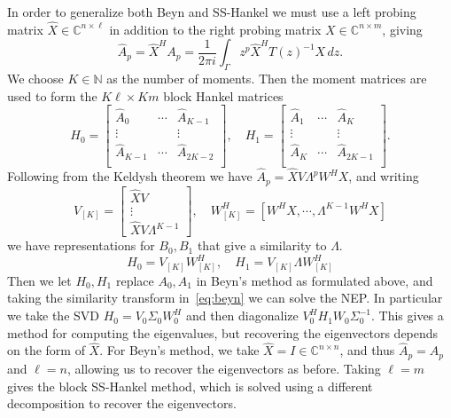 \documentclass[onefignum,onetabnum]{siamart190516}
\begin{document}
In order to generalize both Beyn and SS-Hankel we must use a left probing matrix \( \widehat{X} \in \mathbb{C}^{n \times \ell} \) in addition to the right probing matrix \( X \in \mathbb{C}^{n \times m} \), giving
\begin{equation}\label{eq:moments_left}
	\widehat{A}_p = \widehat{X}^H A_p = \frac{1}{2 \pi i} \int_{\Gamma} z^p \widehat{X}^H {T(z)}^{-1} X \, dz.
\end{equation}
We choose \( K \in \mathbb{N} \) as the number of moments.
Then the moment matrices are used to form the \( K\ell \times K m \) block Hankel matrices
\begin{equation}
	H_0 = \begin{bmatrix}
		\widehat{A}_0 & \cdots & \widehat{A}_{K-1}  \\
		\vdots & & \vdots \\
		\widehat{A}_{K-1} & \cdots & \widehat{A}_{2K-2}  \\
	\end{bmatrix},
	\quad
	H_1 = \begin{bmatrix}
		\widehat{A}_1 & \cdots & \widehat{A}_{K}  \\
		\vdots & & \vdots \\
		\widehat{A}_{K} & \cdots & \widehat{A}_{2K-1}  \\
	\end{bmatrix}.
\end{equation}
Following from the Keldysh theorem we have \( \widehat{A}_p = \widehat{X} V\Lambda^p W^H X \), and writing
\begin{equation}
	V_{[K]} = \begin{bmatrix}
		\widehat{X}V  \\
		\vdots \\
		\widehat{X}V \Lambda^{K-1}
	\end{bmatrix}
	,\quad
	W_{[K]}^H = [W^H X, \cdots, \Lambda^{K-1} W^H X]
\end{equation}
we have representations for \( B_0, B_1 \) that give a similarity to \( \Lambda \).
\begin{equation}
	H_0 = V_{[K]} W_{[K]}^H,
	\quad
	H_1 = V_{[K]} \Lambda W_{[K]}^H
\end{equation}
Then we let \( H_0, H_1 \) replace \( A_0, A_1 \) in Beyn's method as formulated above, and taking the similarity transform in~\ref{eq:beyn} we can solve the NEP.
In particular we take the SVD \( H_0 = V_0\Sigma_0 W^H_0  \) and then diagonalize \( V_0^H H_1 W_0 \Sigma_0^{-1} \).
This gives a method for computing the eigenvalues, but recovering the eigenvectors depends on the form of \( \widehat{X} \).
For Beyn's method, we take \( \widehat{X} = I \in \mathbb{C}^{n\times n} \), and thus \( \widehat{A}_p = A_p \) and \( \ell = n \), allowing us to recover the eigenvectors as before.
Taking \( \ell = m  \) gives the block SS-Hankel method, which is solved using a different decomposition to recover the eigenvectors.
\end{document}
